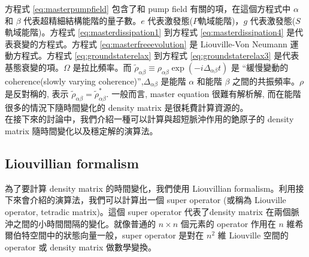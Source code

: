 \documentclass[11pt,a4paper]{article}
\begin{document}
方程式 \ref{eq:masterpumpfield} 包含了和 pump field 有關的項，在這個方程式中 $\alpha$ 和 $\beta$ 代表超精細結構能階的量子數。$e$ 代表激發態($P$軌域能階)，$g$ 代表激發態($S$軌域能階)。方程式 \ref{eq:masterdissipation1} 到方程式 \ref{eq:masterdissipation4} 是代表衰變的方程式。方程式 \ref{eq:masterfreeevolution} 是 Liouville-Von Neumann 運動方程式。方程式 \ref{eq:groundstaterelax} 到方程式 \ref{eq:groundstaterelax3} 是代表基態衰變的項。$\Omega$ 是拉比頻率。而 $\tilde{\rho}_{\alpha\beta} \equiv \rho_{\alpha\beta} \exp \left( -i \Delta_{\alpha\beta} t \right)$ 是 ``緩慢變動的coherence(slowly varying coherence)'',$\Delta_{\alpha\beta}$ 是能階 $\alpha$ 和能階 $\beta$ 之間的共振頻率。$\rho$ 是反對稱的, 表示 $\tilde{\rho}_{\alpha\beta} = \tilde{\rho}^{\ast}_{\alpha\beta}$. 一般而言, master equation 很難有解析解, 而在能階很多的情況下隨時間變化的 density matrix 是很耗費計算資源的。\\


在接下來的討論中，我們介紹一種可以計算與超短脈沖作用的銫原子的 density matrix 隨時間變化以及穩定解的演算法。\\

\subsection{Liouvillian formalism}
為了要計算 density matrix 的時間變化，我們使用 Liouvillian formalism。利用接下來會介紹的演算法，我們可以計算出一個 super operator (或稱為 Liouville operator, tetradic matrix)。這個 super operator 代表了density matrix 在兩個脈沖之間的小時間間隔的變化。就像普通的 $n \times n$ 個元素的 operator 作用在 $n$ 維希爾伯特空間中的狀態向量一般，super operator 是對在 $n^2$ 維 Liouville 空間的 operator 或 density matrix 做數學變換。\\
\end{document}
